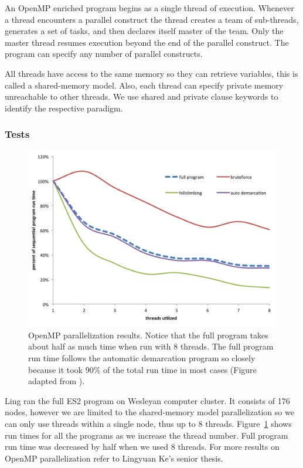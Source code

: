 An OpenMP enriched program begins as a single thread of execution.
Whenever a thread encounters a parallel construct the thread creates a team of sub-threads, generates a set of tasks, and then declares itself master of the team.
Only the master thread resumes execution beyond the end of the parallel construct.
The program can specify any number of parallel constructs.

All threads have access to the same memory so they can retrieve variables, this is called a shared-memory model.
Also, each thread can specify private memory unreachable to other threads.
We use shared and private clause keywords to identify the respective paradigm.

\subsubsection*{Tests}
\begin{figure}[h!]
\centering
\includegraphics[scale=0.6]{images/LingParallelized-CH4}
\caption[OpenMP parallelization results.]{OpenMP parallelization results. Notice that the full program takes about half as much time when run with 8 threads. The full program run time follows the automatic demarcation program so closely because it took 90\% of the total run time in most cases (Figure adapted from \protect\cite{lingThesis}).}
\label{fig:LingParallelized}
\end{figure}

Ling ran the full ES2 program on Wesleyan computer cluster.
It consists of 176 nodes, however we are limited to the shared-memory model parallelization so we can only use threads within a single node, thus up to 8 threads.
Figure~\ref{fig:LingParallelized} shows run times for all the programs as we increase the thread number.
Full program run time was decreased by half when we used 8 threads.
For more results on OpenMP parallelization refer to Lingyuan Ke's senior thesis.

